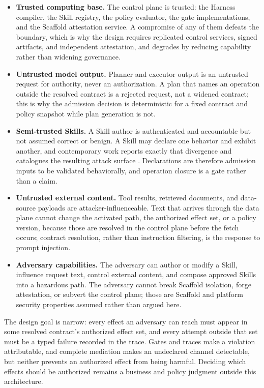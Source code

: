 \documentclass[11pt]{article}
\begin{document}
\begin{itemize}
\item \textbf{Trusted computing base.} The control plane is trusted: the Harness compiler, the Skill registry, the policy evaluator, the gate implementations, and the Scaffold attestation service. A compromise of any of them defeats the boundary, which is why the design requires replicated control services, signed artifacts, and independent attestation, and degrades by reducing capability rather than widening governance.
\item \textbf{Untrusted model output.} Planner and executor output is an untrusted request for authority, never an authorization. A plan that names an operation outside the resolved contract is a rejected request, not a widened contract; this is why the admission decision is deterministic for a fixed contract and policy snapshot while plan generation is not.
\item \textbf{Semi-trusted Skills.} A Skill author is authenticated and accountable but not assumed correct or benign. A Skill may declare one behavior and exhibit another, and contemporary work reports exactly that divergence \cite{zhang2026misalignment} and catalogues the resulting attack surface \cite{badhe2026skillsecurity}. Declarations are therefore admission inputs to be validated behaviorally, and operation closure is a gate rather than a claim.
\item \textbf{Untrusted external content.} Tool results, retrieved documents, and data-source payloads are attacker-influenceable. Text that arrives through the data plane cannot change the activated path, the authorized effect set, or a policy version, because those are resolved in the control plane before the fetch occurs; contract resolution, rather than instruction filtering, is the response to prompt injection.
\item \textbf{Adversary capabilities.} The adversary can author or modify a Skill, influence request text, control external content, and compose approved Skills into a hazardous path. The adversary cannot break Scaffold isolation, forge attestation, or subvert the control plane; those are Scaffold and platform security properties assumed rather than argued here.
\end{itemize}

The design goal is narrow: every effect an adversary can reach must appear in some resolved contract's authorized effect set, and every attempt outside that set must be a typed failure recorded in the trace. Gates and traces make a violation attributable, and complete mediation makes an undeclared channel detectable, but neither prevents an authorized effect from being harmful. Deciding which effects should be authorized remains a business and policy judgment outside this architecture.
\end{document}

